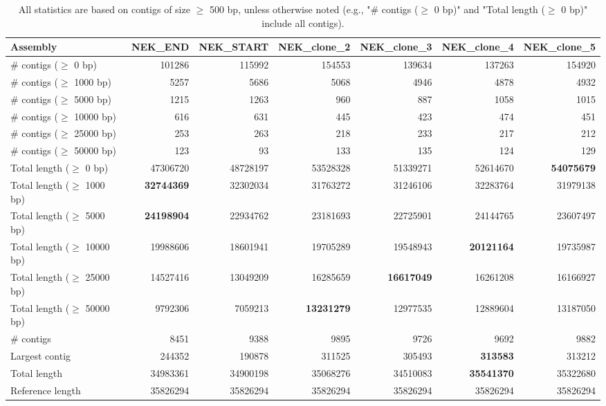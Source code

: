 \documentclass[12pt,a4paper]{article}
\begin{document}
\begin{table}[ht]
\begin{center}
\caption{All statistics are based on contigs of size $\geq$ 500 bp, unless otherwise noted (e.g., "\# contigs ($\geq$ 0 bp)" and "Total length ($\geq$ 0 bp)" include all contigs).}
\begin{tabular}{|l*{6}{|r}|}
\hline
Assembly & NEK\_END & NEK\_START & NEK\_clone\_2 & NEK\_clone\_3 & NEK\_clone\_4 & NEK\_clone\_5 \\ \hline
\# contigs ($\geq$ 0 bp) & 101286 & 115992 & 154553 & 139634 & 137263 & 154920 \\ \hline
\# contigs ($\geq$ 1000 bp) & 5257 & 5686 & 5068 & 4946 & 4878 & 4932 \\ \hline
\# contigs ($\geq$ 5000 bp) & 1215 & 1263 & 960 & 887 & 1058 & 1015 \\ \hline
\# contigs ($\geq$ 10000 bp) & 616 & 631 & 445 & 423 & 474 & 451 \\ \hline
\# contigs ($\geq$ 25000 bp) & 253 & 263 & 218 & 233 & 217 & 212 \\ \hline
\# contigs ($\geq$ 50000 bp) & 123 & 93 & 133 & 135 & 124 & 129 \\ \hline
Total length ($\geq$ 0 bp) & 47306720 & 48728197 & 53528328 & 51339271 & 52614670 & {\bf 54075679} \\ \hline
Total length ($\geq$ 1000 bp) & {\bf 32744369} & 32302034 & 31763272 & 31246106 & 32283764 & 31979138 \\ \hline
Total length ($\geq$ 5000 bp) & {\bf 24198904} & 22934762 & 23181693 & 22725901 & 24144765 & 23607497 \\ \hline
Total length ($\geq$ 10000 bp) & 19988606 & 18601941 & 19705289 & 19548943 & {\bf 20121164} & 19735987 \\ \hline
Total length ($\geq$ 25000 bp) & 14527416 & 13049209 & 16285659 & {\bf 16617049} & 16261208 & 16166927 \\ \hline
Total length ($\geq$ 50000 bp) & 9792306 & 7059213 & {\bf 13231279} & 12977535 & 12889604 & 13187050 \\ \hline
\# contigs & 8451 & 9388 & 9895 & 9726 & 9692 & 9882 \\ \hline
Largest contig & 244352 & 190878 & 311525 & 305493 & {\bf 313583} & 313212 \\ \hline
Total length & 34983361 & 34900198 & 35068276 & 34510083 & {\bf 35541370} & 35322680 \\ \hline
Reference length & 35826294 & 35826294 & 35826294 & 35826294 & 35826294 & 35826294 \\ \hline

\end{tabular}
\end{center}
\end{table}
\end{document}
